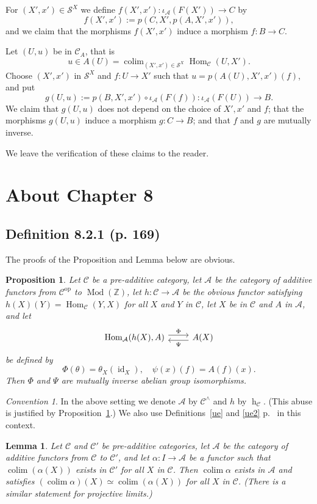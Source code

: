 \documentclass[12pt]{article}%
\newtheorem{lem}[thm]{Lemma}
\newtheorem{prop}[thm]{Proposition}
\theoremstyle{remark}
\newtheorem{conv}[thm]{Convention}
\theoremstyle{definition}
\newcommand{\bb}{\mathbb}
\newcommand{\A}{\mathcal A}
\newcommand{\C}{\mathcal C}
\newcommand{\SSS}{\mathcal S}
\DeclareMathOperator*{\colim}{colim}
\DeclareMathOperator{\hy}{h}
\DeclareMathOperator{\id}{id}
\DeclareMathOperator{\Hom}{Hom}%
\DeclareMathOperator{\Mod}{Mod}
\DeclareMathOperator{\op}{op}
\begin{document}
For $(X',x')\in\SSS^X$ we define $f(X',x'):\iota_\A(F(X'))\to C$ by 
$$
f(X',x'):=p(C,X',p(A,X',x')),
$$ 
and we claim that the morphisms $f(X',x')$ induce a morphism $f:B\to C$. 

Let $(U,u)$ be in $\C_A$, that is
$$
u\in A(U)=\colim_{(X',x')\in\SSS^X}\Hom_\C(U,X').
$$ 
Choose $(X',x')$ in $\SSS^X$ and $f:U\to X'$ such that $u=p(A(U),X',x')(f)$, and put 
$$
g(U,u):=p(B,X',x')\circ\iota_\A(F(f)):\iota_\A(F(U))\to B.
$$ 
We claim that $g(U,u)$ does not depend on the choice of $X',x'$ and $f$; that the morphisms $g(U,u)$ induce a morphism $g:C\to B$; and that $f$ and $g$ are mutually inverse. 

We leave the verification of these claims to the reader. 


\section{About Chapter 8}

\subsection{Definition 8.2.1 (p. 169)}

The proofs of the Proposition and Lemma below are obvious. 
\begin{prop}\label{payp}
Let $\C$ be a pre-additive category, let $\A$ be the category of additive functors from $\C^{\op}$ to $\Mod(\bb Z)$, let $h:\C\to\A$ be the obvious functor satisfying $h(X)(Y)=\Hom_\C(Y,X)$ for all $X$ and $Y$ in $\C$, let $X$ be in $\C$ and $A$ in $\A$, and let 
$$
\begin{tikzcd}
\Hom_\A(h(X),A)\ar[yshift=.7ex]{r}{\Phi}&A(X)\ar[yshift=-.7ex]{l}{\Psi}
\end{tikzcd}
$$
be defined by 
$$
\Phi(\theta)=\theta_X(\id_X),\quad\psi(x)(f)=A(f)(x).
$$
Then $\Phi$ and $\Psi$ are mutually inverse abelian group isomorphisms.
\end{prop}
\begin{conv}\label{payc}
In the above setting we denote $\A$ by $\C^\wedge$ and $h$ by $\hy_\C$. (This abuse is justified by Proposition~\ref{payp}.) We also use Definitions~\ref{ue} and \ref{ue2} p.~\pageref{ue} in this context.
\end{conv} 
\begin{lem}\label{payl}
Let $\C$ and $\C'$ be pre-additive categories, let $\A$ be the category of additive functors from $\C$ to $\C'$, and let $\alpha:I\to\A$ be a functor such that $\colim(\alpha(X))$ exists in $\C'$ for all $X$ in $\C$. Then $\colim\alpha$ exists in $\A$ and satisfies $(\colim\alpha)(X)\simeq\colim(\alpha(X))$ for all $X$ in $\C$. (There is a similar statement for projective limits.)
\end{lem}
\end{document}
